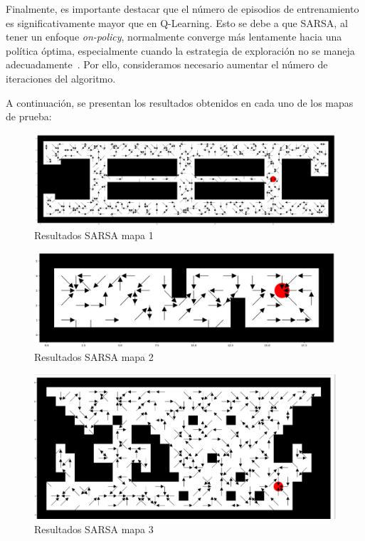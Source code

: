 \documentclass[conference,a4paper]{IEEEtran}
\begin{document}
Finalmente, es importante destacar que el número de episodios de entrenamiento es significativamente mayor que en Q-Learning. Esto se debe a que SARSA, al tener un enfoque \textit{on-policy}, normalmente converge más lentamente hacia una política óptima, especialmente cuando la estrategia de exploración no se 
maneja adecuadamente~\cite{b4}. Por ello, consideramos necesario aumentar el número de iteraciones del algoritmo.

A continuación, se presentan los resultados obtenidos en cada uno de los mapas de prueba:\newline

\begin{figure}[h]
  \centering
  \includegraphics[scale=0.29]{resultado_sarsa_mapa_1}
  \caption{Resultados SARSA mapa 1}
  \label{fig:resultado_sarsa_mapa_1}
\end{figure}

\begin{figure}[h]
  \centering
  \includegraphics[scale=0.25]{resultado_sarsa_mapa_2}
  \caption{Resultados SARSA mapa 2}
  \label{fig:resultado_sarsa_mapa_2}

\end{figure}

\begin{figure}[h]
  \centering
  \includegraphics[scale=0.24]{resultado_sarsa_mapa_3}
  \caption{Resultados SARSA mapa 3}
  \label{fig:resultado_sarsa_mapa_3}
\end{figure}
\end{document}
